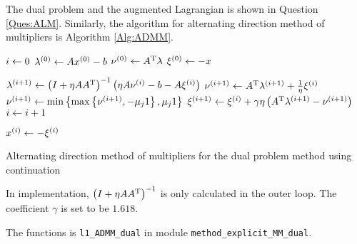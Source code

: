\documentclass[english]{pkupaper}
\begin{document}
\begin{thmquestion}[3 (h)]
The dual problem and the augmented Lagrangian is shown in Question \ref{Ques:ALM}. Similarly, the algorithm for alternating direction method of multipliers is Algorithm \ref{Alg:ADMM}.

\begin{algorithm}
\SetAlgoLined


$ i \leftarrow 0 $\;
$ \lambda^{\left( 0 \right)} \leftarrow A x^{\left( 0 \right)} - b $\;
$ \nu^{\left( 0 \right)} \leftarrow A^{\mathrm{T}} \lambda $\;
$ \xi^{\left( 0 \right)} \leftarrow -x $\;

{
	{
		$ \lambda^{\left(  i + 1  \right)} \leftarrow \left(  I + \eta A A^{\mathrm{T}}  \right)^{-1} \left(  \eta A \nu^{\left( i \right)} - b - A \xi^{\left( i \right)}  \right) $ \;
		$ \nu^{\left(  i + 1  \right)} \leftarrow A^{\mathrm{T}} \lambda^{\left(  i + 1  \right)} + \frac{1}{\eta} \xi^{\left( i \right)} $\;
		$ \nu^{\left(  i + 1  \right)} \leftarrow \min \left\{  \max \left\{  \nu^{\left(  i + 1  \right)}, -\mu_j 1  \right\}, \mu_j 1  \right\} $\;
		$ \xi^{\left(  i + 1  \right)} \leftarrow \xi^{\left( i \right)} + \gamma \eta \left(  A^{\mathrm{T}} \lambda^{\left(  i + 1  \right)} - \nu^{\left(  i + 1  \right)}  \right) $\;
		$ i \leftarrow i + 1 $\;
	}
}

$ x^{\left( i \right)} \leftarrow -\xi^{\left( i \right)} $\;

\caption{Alternating direction method of multipliers for the dual problem method using continuation} \label{Alg:ADMM}
\end{algorithm}

In implementation, $ \left(  I + \eta A A^{\mathrm{T}}  \right)^{-1} $ is only calculated in the outer loop. The coefficient $\gamma$ is set to be $1.618$.

The functions is \verb"l1_ADMM_dual" in module \verb"method_explicit_MM_dual".
\end{thmquestion}
\end{document}
